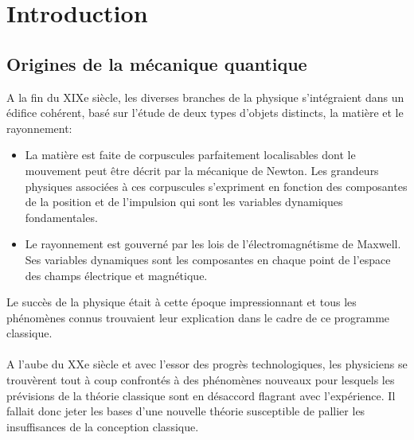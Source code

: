 \chapter*{Introduction}

\section*{Origines de la mécanique quantique}
A la fin du XIXe siècle, les diverses branches de la physique s'intégraient dans un édifice cohérent, basé sur l'étude de deux types d’objets distincts, la matière et le rayonnement:
\begin{itemize}
	\item La matière est faite de corpuscules parfaitement localisables dont le mouvement peut être décrit par la mécanique de Newton. Les grandeurs physiques associées à ces corpuscules s’expriment en fonction des composantes de la position et de l’impulsion qui sont les variables dynamiques fondamentales.
	\item Le rayonnement est gouverné par les lois de l'électromagnétisme de Maxwell. Ses variables dynamiques sont les composantes en chaque point de l’espace des champs électrique et magnétique.
\end{itemize}
Le succès de la physique était à cette époque impressionnant et tous les phénomènes connus trouvaient leur explication dans le cadre de ce programme classique.\\\\

A l’aube du XXe siècle et avec l’essor des progrès technologiques, les physiciens se trouvèrent tout à coup confrontés à des phénomènes nouveaux pour lesquels les prévisions de la théorie classique sont en désaccord flagrant avec l'expérience. Il fallait donc jeter les bases d’une nouvelle théorie susceptible de pallier les insuffisances de la conception classique.

